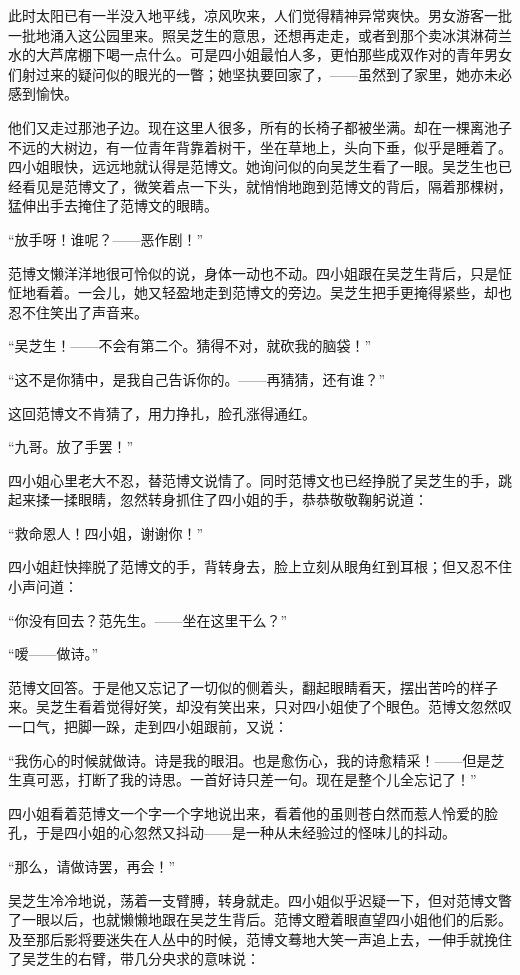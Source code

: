 \par 此时太阳已有一半没入地平线，凉风吹来，人们觉得精神异常爽快。男女游客一批一批地涌入这公园里来。照吴芝生的意思，还想再走走，或者到那个卖冰淇淋荷兰水的大芦席棚下喝一点什么。可是四小姐最怕人多，更怕那些成双作对的青年男女们射过来的疑问似的眼光的一瞥；她坚执要回家了，——虽然到了家里，她亦未必感到愉快。
\par 他们又走过那池子边。现在这里人很多，所有的长椅子都被坐满。却在一棵离池子不远的大树边，有一位青年背靠着树干，坐在草地上，头向下垂，似乎是睡着了。四小姐眼快，远远地就认得是范博文。她询问似的向吴芝生看了一眼。吴芝生也已经看见是范博文了，微笑着点一下头，就悄悄地跑到范博文的背后，隔着那棵树，猛伸出手去掩住了范博文的眼睛。
\par “放手呀！谁呢？——恶作剧！”
\par 范博文懒洋洋地很可怜似的说，身体一动也不动。四小姐跟在吴芝生背后，只是怔怔地看着。一会儿，她又轻盈地走到范博文的旁边。吴芝生把手更掩得紧些，却也忍不住笑出了声音来。
\par “吴芝生！——不会有第二个。猜得不对，就砍我的脑袋！”
\par “这不是你猜中，是我自己告诉你的。——再猜猜，还有谁？”
\par 这回范博文不肯猜了，用力挣扎，脸孔涨得通红。
\par “九哥。放了手罢！”
\par 四小姐心里老大不忍，替范博文说情了。同时范博文也已经挣脱了吴芝生的手，跳起来揉一揉眼睛，忽然转身抓住了四小姐的手，恭恭敬敬鞠躬说道：
\par “救命恩人！四小姐，谢谢你！”
\par 四小姐赶快摔脱了范博文的手，背转身去，脸上立刻从眼角红到耳根；但又忍不住小声问道：
\par “你没有回去？范先生。——坐在这里干么？”
\par “嗳——做诗。”
\par 范博文回答。于是他又忘记了一切似的侧着头，翻起眼睛看天，摆出苦吟的样子来。吴芝生看着觉得好笑，却没有笑出来，只对四小姐使了个眼色。范博文忽然叹一口气，把脚一跺，走到四小姐跟前，又说：
\par “我伤心的时候就做诗。诗是我的眼泪。也是愈伤心，我的诗愈精采！——但是芝生真可恶，打断了我的诗思。一首好诗只差一句。现在是整个儿全忘记了！”
\par 四小姐看着范博文一个字一个字地说出来，看着他的虽则苍白然而惹人怜爱的脸孔，于是四小姐的心忽然又抖动——是一种从未经验过的怪味儿的抖动。
\par “那么，请做诗罢，再会！”
\par 吴芝生冷冷地说，荡着一支臂膊，转身就走。四小姐似乎迟疑一下，但对范博文瞥了一眼以后，也就懒懒地跟在吴芝生背后。范博文瞪着眼直望四小姐他们的后影。及至那后影将要迷失在人丛中的时候，范博文蓦地大笑一声追上去，一伸手就挽住了吴芝生的右臂，带几分央求的意味说：
